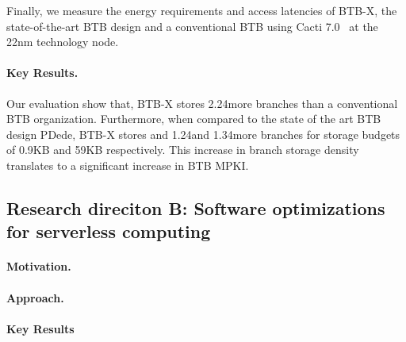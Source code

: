\documentclass[../main.tex]{subfiles}
\begin{document}
\begin{refsection}
Finally, we measure the energy requirements and access latencies of
BTB-X, the state-of-the-art BTB design and a conventional BTB using Cacti 7.0~\cite{cacti} at the 22nm technology node.

\paragraph{Key Results.}

Our evaluation show that, BTB-X stores 2.24\texttimes more branches
than a conventional BTB organization. Furthermore, when compared to
the state of the art BTB design PDede, BTB-X stores  and
1.24\texttimes and 1.34\texttimes more branches for storage budgets of
0.9KB and 59KB respectively. This increase in branch storage density
translates to a significant increase in BTB MPKI. 


\subsection{Research direciton B: Software optimizations for serverless computing}

\paragraph{Motivation.}


\paragraph{Approach.}

\paragraph{Key Results}



\ifx\chapincluded\undefined
  \printbibliography
  \end{refsection}
 \fi
\end{document}
